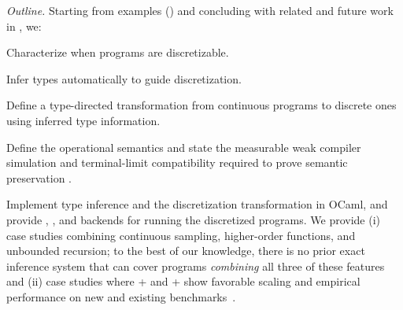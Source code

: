 \smallskip
\noindent\emph{Outline.} Starting from examples () and concluding with related and future work in , we:
\begin{description}[leftmargin=0.3cm,topsep=3pt,itemsep=1pt]
    \item[Type System (\Cref{sec:language})] Characterize when programs are discretizable.
       \item[Type Inference (\Cref{sec:type-inference})] Infer types automatically to guide discretization.%
    \item[Exact Discretization (\Cref{sec:discretization})] Define a type-directed transformation from continuous programs to discrete ones using inferred type information.
    \item[Soundness (\Cref{sec:soundness})] Define the operational semantics and state the measurable weak compiler simulation and terminal-limit compatibility required to prove semantic preservation
    \cite{Bizjak2015Step,Wand2018Contextual,Culpepper2017ContextualScoring}.
    \item[Implementation, Case Studies, and Evaluation (\Cref{sec:implem_eval})] Implement \Slice{} type inference and the discretization transformation in OCaml, and provide \Dice{}, \Roulette{}, and \Storm{} backends for running the discretized programs. We provide (i) case studies combining continuous sampling, higher-order functions, and unbounded recursion; to the best of our knowledge, there is no prior exact inference system that can cover programs \emph{combining} all three of these features and (ii) case studies where \Slice{}+\Dice{} and \Slice{}+\Roulette{} show favorable scaling and empirical performance on new and existing benchmarks~\cite{gehr2016psi,Saad2021SPPL}.
\end{description}
